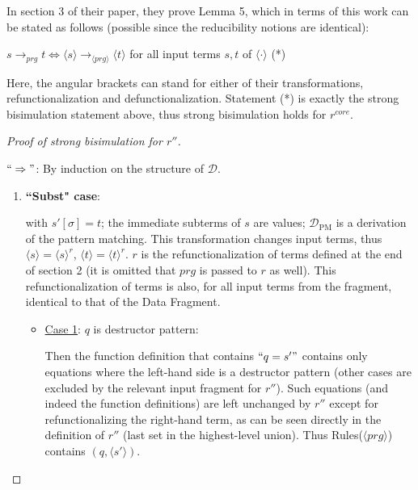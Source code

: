 \documentclass[11pt]{article} %
\begin{document}
In section 3 of their paper, they prove Lemma 5, which in terms of this work can be stated as follows (possible since the reducibility notions are identical):

$s \longrightarrow_{prg} t \iff \langle s \rangle \longrightarrow_{\langle prg \rangle} \langle t \rangle$ for all input terms $s,t$ of $\langle \cdot \rangle$ (*)

Here, the angular brackets can stand for either of their transformations, refunctionalization and defunctionalization. Statement (*) is exactly the strong bisimulation statement above, thus strong bisimulation holds for $r^{core}$.

\begin{proof}[Proof of strong bisimulation for $r''$] ~

$`` \Rightarrow "$: By induction on the structure of $\mathcal{D}$.

\begin{enumerate}
\item \textbf{``Subst" case}:

\begin{prooftree}
\end{prooftree}

with $s'[\sigma] = t$; the immediate subterms of $s$ are values; $\mathcal{D}_{\textrm{PM}}$ is a derivation of the pattern matching. This transformation changes input terms, thus $\langle s \rangle = \langle s \rangle^r$, $\langle t \rangle = \langle t \rangle^r$. $r$ is the refunctionalization of terms defined at the end of section 2 (it is omitted that $prg$ is passed to $r$ as well). This refunctionalization of terms is also, for all input terms from the fragment, identical to that of the Data Fragment.

\begin{itemize}

\item \underline{Case 1}: $q$ is destructor pattern:

Then the function definition that contains $`` q = s' "$ contains only equations where the left-hand side is a destructor pattern (other cases are excluded by the relevant input fragment for $r''$). Such equations (and indeed the function definitions) are left unchanged by $r''$ except for refunctionalizing the right-hand term, as can be seen directly in the definition of $r''$ (last set in the highest-level union). Thus Rules($\langle prg \rangle$) contains $(q, \langle s' \rangle)$.


\end{itemize}
\end{enumerate}
\end{proof}
\end{document}
